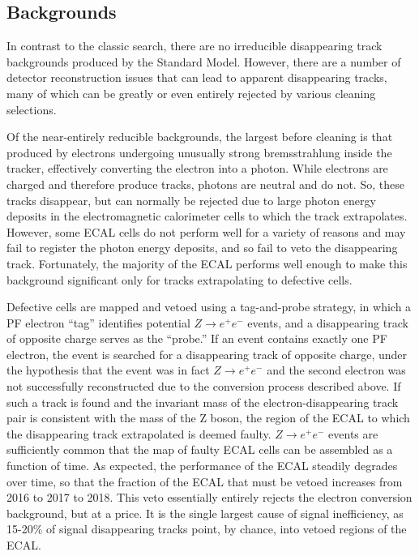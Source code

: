   \subsection{Backgrounds} \label{sec:distracksbg}

  In contrast to the classic search, there are no irreducible disappearing track backgrounds produced by the Standard Model.
  However, there are a number of detector reconstruction issues that can lead to apparent disappearing tracks, many of which can be greatly or even entirely rejected by various cleaning selections.

  Of the near-entirely reducible backgrounds, the largest before cleaning is that produced by electrons undergoing unusually strong bremsstrahlung inside the tracker, effectively converting the electron into a photon.
  While electrons are charged and therefore produce tracks, photons are neutral and do not.
  So, these tracks disappear, but can normally be rejected due to large photon energy deposits in the electromagnetic calorimeter cells to which the track extrapolates.
  However, some ECAL cells do not perform well for a variety of reasons and may fail to register the photon energy deposits, and so fail to veto the disappearing track.
  Fortunately, the majority of the ECAL performs well enough to make this background significant only for tracks extrapolating to defective cells.

  Defective cells are mapped and vetoed using a tag-and-probe strategy, in which a PF electron ``tag'' identifies potential $Z\rightarrow e^+e^-$ events, and a disappearing track of opposite charge serves as the ``probe.''
  If an event contains exactly one PF electron, the event is searched for a disappearing track of opposite charge, under the hypothesis that the event was in fact $Z\rightarrow e^+e^-$ and the second electron was not successfully reconstructed due to the conversion process described above.
  If such a track is found and the invariant mass of the electron-disappearing track pair is consistent with the mass of the Z boson, the region of the ECAL to which the disappearing track extrapolated is deemed faulty.
  $Z\rightarrow e^+e^-$ events are sufficiently common that the map of faulty ECAL cells can be assembled as a function of time.
  As expected, the performance of the ECAL steadily degrades over time, so that the fraction of the ECAL that must be vetoed increases from 2016 to 2017 to 2018.
  This veto essentially entirely rejects the electron conversion background, but at a price. 
  It is the single largest cause of signal inefficiency, as 15-20\% of signal disappearing tracks point, by chance, into vetoed regions of the ECAL.

